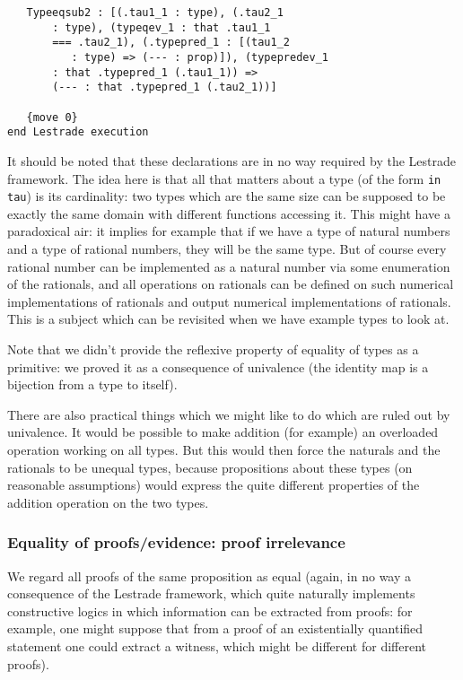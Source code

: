 \documentclass[12pt]{article}
\begin{document}
\begin{verbatim}
   Typeeqsub2 : [(.tau1_1 : type), (.tau2_1 
       : type), (typeqev_1 : that .tau1_1 
       === .tau2_1), (.typepred_1 : [(tau1_2 
          : type) => (--- : prop)]), (typepredev_1 
       : that .typepred_1 (.tau1_1)) => 
       (--- : that .typepred_1 (.tau2_1))]

   {move 0}
end Lestrade execution

\end{verbatim}

It should be noted that these declarations are in no way required by the Lestrade framework.  The idea here is that all that matters about a type (of the form {\tt in tau}) is its cardinality:  two types which are the same size can be supposed to be exactly the same domain with different functions accessing it.  This might have a paradoxical air:  it implies for example that if we have a type of natural numbers and a type of rational numbers, they will be the same type.  But of course every rational number can be implemented as a natural number via some enumeration of the rationals, and all operations on rationals can be defined on such numerical implementations of rationals and output numerical implementations of rationals.   This is a subject which can be revisited when we have example types to look at.

Note that we didn't provide the reflexive property of equality of types as a primitive:  we proved it as a consequence of univalence (the identity map is a bijection from a type to itself).

There are also practical things which we might like to do which are ruled out by univalence.  It would be possible to make addition (for example) an overloaded operation working on all types.  But this would then force the naturals and the rationals to be unequal types, because propositions about these types (on reasonable assumptions) would express the quite different properties of the addition operation on the two types.

\subsubsection{Equality of proofs/evidence: proof irrelevance}

We regard all proofs of the same proposition as equal (again, in no way a consequence of the Lestrade framework, which quite naturally implements constructive logics in which information can be extracted from proofs:  for example, one might suppose that from a proof of an existentially quantified statement one could extract a witness, which might be different for different proofs).
\end{document}
